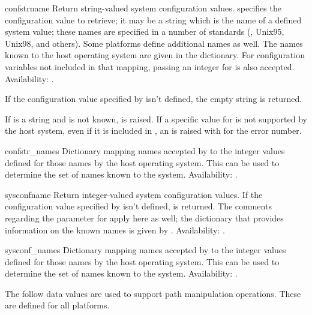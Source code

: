 \begin{funcdesc}{confstr}{name}
Return string-valued system configuration values.
 specifies the configuration value to retrieve; it may be a
string which is the name of a defined system value; these names are
specified in a number of standards (\POSIX, Unix95, Unix98, and
others).  Some platforms define additional names as well.  The names
known to the host operating system are given in the
 dictionary.  For configuration variables not
included in that mapping, passing an integer for  is also
accepted.
Availability: \UNIX{}.

If the configuration value specified by  isn't defined, the
empty string is returned.

If  is a string and is not known,  is
raised.  If a specific value for  is not supported by the
host system, even if it is included in , an
 is raised with  for the
error number.
\end{funcdesc}

\begin{datadesc}{confstr_names}
Dictionary mapping names accepted by  to the
integer values defined for those names by the host operating system.
This can be used to determine the set of names known to the system.
Availability: \UNIX.
\end{datadesc}

\begin{funcdesc}{sysconf}{name}
Return integer-valued system configuration values.
If the configuration value specified by  isn't defined,
 is returned.  The comments regarding the 
parameter for  apply here as well; the dictionary
that provides information on the known names is given by
.
Availability: \UNIX{}.
\end{funcdesc}

\begin{datadesc}{sysconf_names}
Dictionary mapping names accepted by  to the
integer values defined for those names by the host operating system.
This can be used to determine the set of names known to the system.
Availability: \UNIX.
\end{datadesc}


The follow data values are used to support path manipulation
operations.  These are defined for all platforms.

